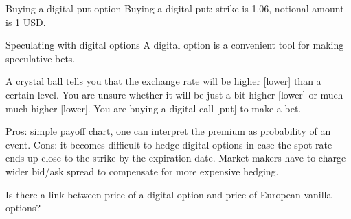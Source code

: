 \documentclass{beamer}
\begin{document}
\begin{frame}{Buying a digital put option}
\justifying
Buying a digital put: strike is 1.06, notional amount is 1 USD.

\justifying
\centering
{}
\end{frame}



\begin{frame}{Speculating with digital options}
\justify
A digital option is a convenient tool for making speculative bets.

\justify
A crystal ball tells you that the exchange rate will be higher [lower] than a certain level. You are unsure whether it will be just a bit higher [lower] or much much higher [lower]. You are buying a digital call [put] to make a bet.

\justify
Pros: simple payoff chart, one can interpret the premium as probability of an event. Cons: it becomes difficult to hedge digital options in case the spot rate ends up close to the strike by the expiration date. Market-makers have to charge wider bid/ask spread to compensate for more expensive hedging.

\justify
Is there a link between price of a digital option and price of European vanilla options?
\end{frame}
\end{document}
